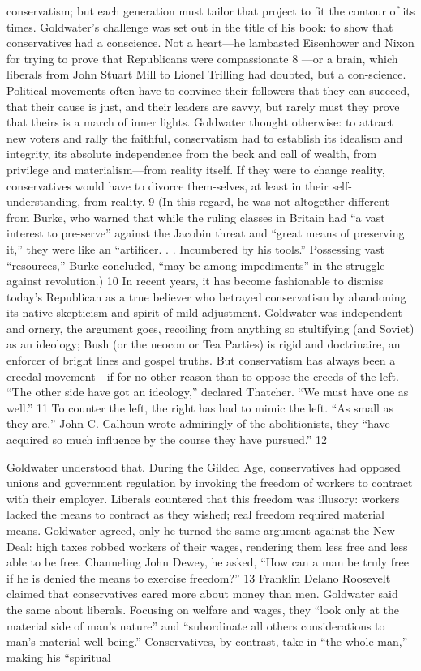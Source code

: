 conservatism; but each generation must tailor that project to fit the contour of its times. Goldwater’s challenge was set out in the title of his book: to show that conservatives had a conscience. Not a heart—he lambasted Eisenhower and Nixon for trying to prove that Republicans were compassionate {\color{blue} 8 } —or a brain, which liberals from John Stuart Mill to Lionel Trilling had doubted, but a con-science. Political movements often have to convince their followers that they can succeed, that their cause is just, and their leaders are savvy, but rarely must they prove that theirs is a march of inner lights. Goldwater thought otherwise: to attract new voters and rally the faithful, conservatism had to establish its idealism and integrity, its absolute independence from the beck and call of wealth, from privilege and materialism—from reality itself. If they were to change reality, conservatives would have to divorce them-selves, at least in their self-understanding, from reality. {\color{blue} 9 } (In this regard, he was not altogether different from Burke, who warned that while the ruling classes in Britain had “a vast interest to pre-serve” against the Jacobin threat and “great means of preserving it,” they were like an “artificer. . . Incumbered by his tools.” Possessing vast “resources,” Burke concluded, “may be among impediments” in the struggle against revolution.) {\color{blue} 10 } In recent years, it has become fashionable to dismiss today’s Republican as a true believer who betrayed conservatism by abandoning its native skepticism and spirit of mild adjustment. Goldwater was independent and ornery, the argument goes, recoiling from anything so stultifying (and Soviet) as an ideology; Bush (or the neocon or Tea Parties) is rigid and doctrinaire, an enforcer of bright lines and gospel truths. But conservatism has always been a creedal movement—if for no other reason than to oppose the creeds of the left. “The other side have got an ideology,” declared Thatcher. “We must have one as well.” {\color{blue} 11 } To counter the left, the right has had to mimic the left. “As small as they are,” John C. Calhoun wrote admiringly of the abolitionists, they “have acquired so much influence by the course they have pursued.” {\color{blue} 12 } {\par} Goldwater understood that. During the Gilded Age, conservatives had opposed unions and government regulation by invoking the freedom of workers to contract with their employer. Liberals countered that this freedom was illusory: workers lacked the means to contract as they wished; real freedom required material means. Goldwater agreed, only he turned the same argument against the New Deal: high taxes robbed workers of their wages, rendering them less free and less able to be free. Channeling John Dewey, he asked, “How can a man be truly free if he is denied the means to exercise freedom?” {\color{blue} 13 } Franklin Delano Roosevelt claimed that conservatives cared more about money than men. Goldwater said the same about liberals. Focusing on welfare and wages, they “look only at the material side of man’s nature” and “subordinate all others considerations to man’s material well-being.” Conservatives, by contrast, take in “the whole man,” making his “spiritual 